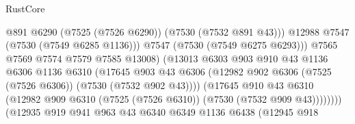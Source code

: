 \begin{lexlean}{RustCore}
\begin{coremodule}
                                              @891
                                              @6290
                                              (@7525 (@7526 @6290))
                                              (@7530 (@7532 @891 @43)))
                                            @12988
                                            @7547
                                            (@7530 (@7549 @6285 @1136)))
                                          @7547
                                          (@7530 (@7549 @6275 @6293)))
                                        @7565
                                        @7569
                                        @7574
                                        @7579
                                        @7585
                                        @13008)
                                      (@13013
                                        @6303
                                        @903
                                        @910
                                        @43
                                        @1136
                                        @6306
                                        @1136
                                        @6310
                                        (@17645
                                          @903
                                          @43
                                          @6306
                                          (@12982
                                            @902
                                            @6306
                                            (@7525 (@7526 @6306))
                                            (@7530 (@7532 @902 @43))))
                                        (@17645
                                          @910
                                          @43
                                          @6310
                                          (@12982
                                            @909
                                            @6310
                                            (@7525 (@7526 @6310))
                                            (@7530 (@7532 @909 @43))))))))
                                (@12935
                                  @919
                                  @941
                                  @963
                                  @43
                                  @6340
                                  @6349
                                  @1136
                                  @6438
                                  (@12945
                                    @918

\end{coremodule}
\end{lexlean}
